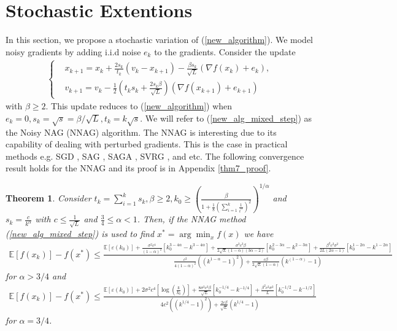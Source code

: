 \documentclass{article}
\theoremstyle{plain}
\newtheorem{theorem}{Theorem}[section]
\theoremstyle{definition}
\theoremstyle{remark}
\begin{document}
\section{Stochastic Extentions}\label{section5}
In this section, we propose a stochastic variation of (\ref{new_algorithm}). We model noisy gradients by adding i.i.d noise $e_k$ to the gradients. Consider the update
\begin{align}\label{new_alg_mixed_step}
    \left\{ \begin{array}{ll}
    &x_{k+1}   =    x_{k} + \frac{2s_k}{t_k}(v_k-x_{k+1})-\frac{\beta s_k}{\sqrt{L}}(\nabla f(x_k)+e_k),\\
     &v_{k+1}    = v_k -\tfrac{1}{2}(t_ks_k+\tfrac{2s_k \beta}{\sqrt{L}})(\nabla f(x_{k+1})+e_{k+1})
    \end{array}\right.
\end{align}
with $\beta \geq 2$. This update reduces to (\ref{new_algorithm}) when \(e_k=0, s_k=\sqrt{s}=\beta/\sqrt{L}, t_k=k\sqrt{s}\). We will refer to (\ref{new_alg_mixed_step}) as the Noisy NAG (NNAG) algorithm. The NNAG is interesting due to its capability of dealing with perturbed gradients. This is the case in practical methods e.g. SGD \citep{bottou2010large}, SAG \citep{schmidt2017minimizing}, SAGA \citep{defazio2014saga}, SVRG \citep{johnson2013accelerating}, and etc. The following convergence result holds for the NNAG and its proof is in Appendix \ref{thm7_proof}.
\begin{theorem}\label{Theorem6}
     Consider $t_k=\sum_{i=1}^k s_k, \beta \geq 2,{k_0\geq (\frac{\beta}{1+\tfrac{1}{8}(\sum_{i=1}^{k}\tfrac{1}{i^{\alpha}})^2})^{1/\alpha}}$ and $s_k=\frac{c}{k^{\alpha}}$ with ${c\leq \frac{1}{\sqrt{L}}}$ and $\frac{3}{4}\leq\alpha<1$. Then, if the NNAG method (\ref{new_alg_mixed_step}) is used to find $x^*=\arg\min_x f(x)$ we have
    \begin{align}
        \mathbb E[f(x_k)]-f(x^*)\leq \tfrac{\mathbb E[\varepsilon(k_0)]+\frac{\sigma^2 c^4}{(1-\alpha)^2} \left[ k_0^{3-4\alpha}-k^{3-4\alpha} \right] + \frac{\sigma^2c^3\beta}{2\sqrt{L}(1-\alpha)(3\alpha -2)}\left[ k_0^{2-3\alpha}-k^{2-3\alpha} \right]+\frac{\beta^2c^2\sigma^2}{2L(2\alpha-1)}\left[ k_0^{1-2\alpha}-k^{1-2\alpha} \right]}{\frac{c^2}{4(1-\alpha)^2}\left((k^{1-\alpha}-1)^2\right)+\frac{c\beta}{2\sqrt{L}(1-\alpha)}\left(k^{(1-\alpha)}-1\right)}\nonumber
    \end{align}
    for $\alpha > 3/4$ and
    \begin{align}\label{Theorem7_rate2}
        \mathbb E[f(x_k)]-f(x^*)\leq \tfrac{\mathbb E[\varepsilon(k_0)]+2\sigma^2 c^4 \left[ \log(\frac{k}{k_0}) \right] + \frac{8\sigma^2c^3\beta}{\sqrt{L}}\left[ k_0^{-1/4}-k^{-1/4} \right]
        +\frac{\beta^2c^2\sigma^2}{L}\left[ k_0^{-1/2}-k^{-1/2} \right]}{4c^2\left((k^{1/4}-1)^2\right)+\frac{2c\beta}{\sqrt{L}}\left(k^{1/4}-1\right)}
    \end{align}
    for $\alpha=3/4$.
\end{theorem}
\end{document}
